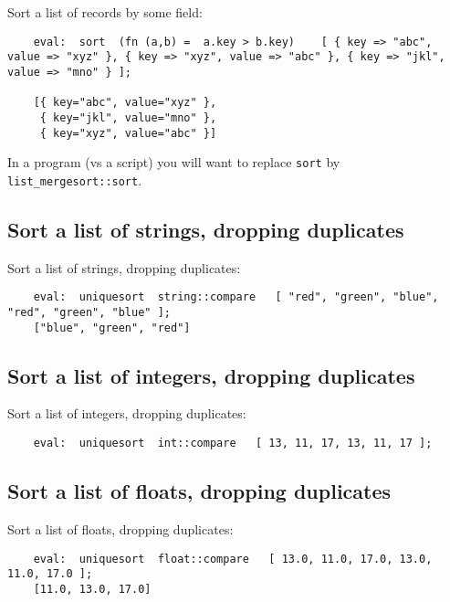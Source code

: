 Sort a list of records by some field:
\begin{verbatim}
    eval:  sort  (fn (a,b) =  a.key > b.key)    [ { key => "abc", value => "xyz" }, { key => "xyz", value => "abc" }, { key => "jkl", value => "mno" } ];

    [{ key="abc", value="xyz" }, 
     { key="jkl", value="mno" }, 
     { key="xyz", value="abc" }]
\end{verbatim}

In a program (vs a script) you will want to replace {\tt sort} by {\tt list\_mergesort::sort}.

\cutend*

\subsection{Sort a list of strings, dropping duplicates}

Sort a list of strings, dropping duplicates:
\begin{verbatim}
    eval:  uniquesort  string::compare   [ "red", "green", "blue", "red", "green", "blue" ];
    ["blue", "green", "red"]
\end{verbatim}

\cutend*

\subsection{Sort a list of integers, dropping duplicates}

Sort a list of integers, dropping duplicates:
\begin{verbatim}
    eval:  uniquesort  int::compare   [ 13, 11, 17, 13, 11, 17 ];
\end{verbatim}

\cutend*

\subsection{Sort a list of floats, dropping duplicates}

Sort a list of floats, dropping duplicates:
\begin{verbatim}
    eval:  uniquesort  float::compare   [ 13.0, 11.0, 17.0, 13.0, 11.0, 17.0 ];
    [11.0, 13.0, 17.0]
\end{verbatim}

